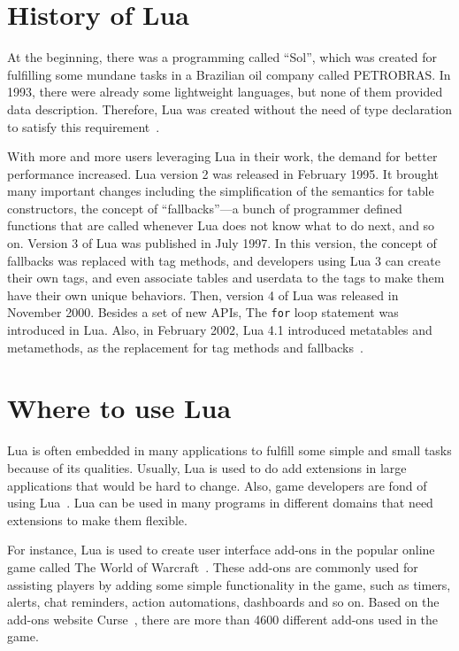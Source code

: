 \section{History of Lua}
At the beginning, there was a programming called ``Sol'', which was created for fulfilling some mundane tasks in a Brazilian oil company called PETROBRAS. In 1993, there were already some lightweight languages, but
none of them provided data description. Therefore, Lua was created without the need of type declaration to satisfy this requirement~\cite{EOL}.

With more and more users leveraging Lua in their work, the demand for better performance increased. Lua version 2 was released in February 1995. It brought many important changes including the simplification of the semantics for table constructors,
the concept of ``fallbacks''---a bunch of programmer defined functions that are called whenever Lua does not know what to do next, and so on. Version 3 of Lua was published in July 1997. In this version, the concept of fallbacks was replaced with tag methods, and developers using Lua 3 can create their own tags, and even associate tables and userdata to the tags to make them have their own unique behaviors. Then, version 4 of Lua was released in November 2000. Besides a set of new APIs, The {\tt for} loop statement was introduced in Lua. 
Also, in February 2002, Lua 4.1 introduced metatables and metamethods, as the replacement for tag methods and fallbacks~\cite{TEL}.

\section{Where to use Lua}
Lua is often embedded in many applications to fulfill some simple and small tasks because of its qualities. Usually, Lua is used to do add extensions in large applications that would be hard to change. Also, game developers are fond of using Lua~\cite{AIL}. Lua can be used in many programs in different domains that need extensions to make them flexible. 

For instance, Lua is used to create user interface add-ons in the popular online game called The World of Warcraft~\cite{WLA}. These add-ons are commonly used for assisting players by adding some simple functionality in the game, such as timers, alerts, chat reminders, action automations, dashboards and so on. Based on the add-ons website Curse~\cite{WCU}, there are more than 4600 different add-ons used in the game.

